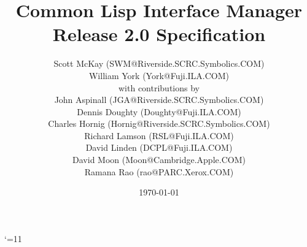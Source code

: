 \batchmode


\let\providecommand\newcommand
	
\pagestyle{headings}

\title{Common Lisp Interface Manager \\
       Release 2.0 Specification}

\author{Scott McKay ({\tentt SWM@Riverside.SCRC.Symbolics.COM}) \\
        William York ({\tentt York@Fuji.ILA.COM}) \\
        {\tenit with contributions by} \\
	{\tenrm John Aspinall ({\tentt JGA@Riverside.SCRC.Symbolics.COM})} \\
        {\tenrm Dennis Doughty ({\tentt Doughty@Fuji.ILA.COM})} \\
	{\tenrm Charles Hornig ({\tentt Hornig@Riverside.SCRC.Symbolics.COM})} \\
        {\tenrm Richard Lamson ({\tentt RSL@Fuji.ILA.COM})} \\
        {\tenrm David Linden ({\tentt DCPL@Fuji.ILA.COM})} \\
        {\tenrm David Moon ({\tentt Moon@Cambridge.Apple.COM})} \\
        {\tenrm Ramana Rao ({\tentt rao@PARC.Xerox.COM})}}
\date{\today}

\makeindex


\catcode`\@=11\relax
\newwrite\@unused


